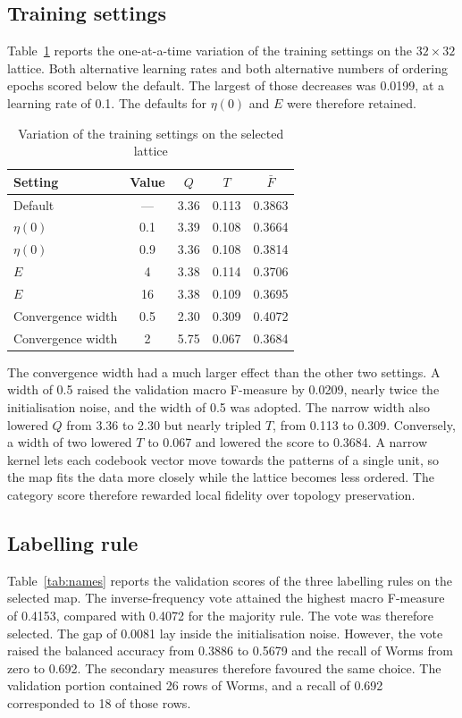 \documentclass[conference,10pt]{IEEEtran}
\begin{document}
\subsection{Training settings}
Table~\ref{tab:sense} reports the one-at-a-time variation of the training settings on the $32\times32$ lattice.
Both alternative learning rates and both alternative numbers of ordering epochs scored below the default.
The largest of those decreases was 0.0199, at a learning rate of 0.1.
The defaults for $\eta(0)$ and $E$ were therefore retained.

\begin{table}[tb]
\caption{Variation of the training settings on the selected lattice}
\label{tab:sense}
\centering
\footnotesize
\begin{tabular}{lcccc}
\toprule
Setting & Value & $Q$ & $T$ & $\bar{F}$ \\
\midrule
Default & --- & 3.36 & 0.113 & 0.3863 \\
$\eta(0)$ & 0.1 & 3.39 & 0.108 & 0.3664 \\
$\eta(0)$ & 0.9 & 3.36 & 0.108 & 0.3814 \\
$E$ & 4 & 3.38 & 0.114 & 0.3706 \\
$E$ & 16 & 3.38 & 0.109 & 0.3695 \\
Convergence width & 0.5 & 2.30 & 0.309 & 0.4072 \\
Convergence width & 2 & 5.75 & 0.067 & 0.3684 \\
\bottomrule
\end{tabular}
\end{table}

The convergence width had a much larger effect than the other two settings.
A width of 0.5 raised the validation macro F-measure by 0.0209, nearly twice the initialisation noise, and the width of 0.5 was adopted.
The narrow width also lowered $Q$ from 3.36 to 2.30 but nearly tripled $T$, from 0.113 to 0.309.
Conversely, a width of two lowered $T$ to 0.067 and lowered the score to 0.3684.
A narrow kernel lets each codebook vector move towards the patterns of a single unit, so the map fits the data more closely while the lattice becomes less ordered.
The category score therefore rewarded local fidelity over topology preservation.

\subsection{Labelling rule}
Table~\ref{tab:names} reports the validation scores of the three labelling rules on the selected map.
The inverse-frequency vote attained the highest macro F-measure of 0.4153, compared with 0.4072 for the majority rule.
The vote was therefore selected.
The gap of 0.0081 lay inside the initialisation noise.
However, the vote raised the balanced accuracy from 0.3886 to 0.5679 and the recall of Worms from zero to 0.692.
The secondary measures therefore favoured the same choice.
The validation portion contained 26 rows of Worms, and a recall of 0.692 corresponded to 18 of those rows.
\end{document}
